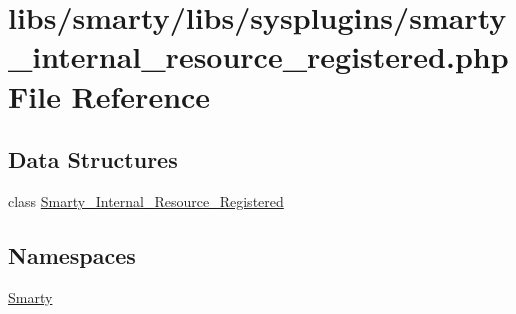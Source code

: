 \hypertarget{smarty__internal__resource__registered_8php}{}\section{libs/smarty/libs/sysplugins/smarty\+\_\+internal\+\_\+resource\+\_\+registered.php File Reference}
\label{smarty__internal__resource__registered_8php}
\subsection*{Data Structures}
\begin{DoxyCompactItemize}
\item 
class \hyperlink{class_smarty___internal___resource___registered}{Smarty\+\_\+\+Internal\+\_\+\+Resource\+\_\+\+Registered}
\end{DoxyCompactItemize}
\subsection*{Namespaces}
\begin{DoxyCompactItemize}
\item 
 \hyperlink{namespace_smarty}{Smarty}
\end{DoxyCompactItemize}
